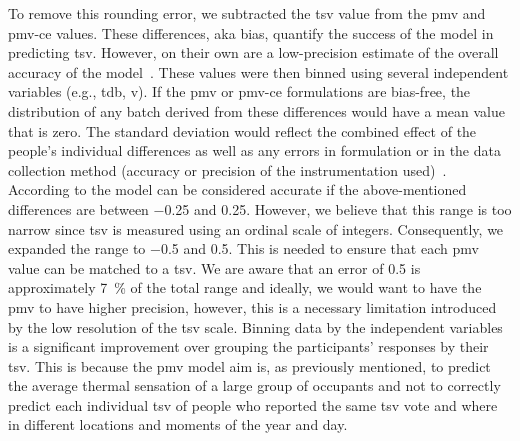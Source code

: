 To remove this rounding error, we subtracted the \ac{tsv} value from the \ac{pmv} and \ac{pmv-ce} values.
These differences, aka bias, quantify the success of the model in predicting \ac{tsv}.
However, on their own are a low-precision estimate of the overall accuracy of the model~\cite{Humphreys2002}.
These values were then binned using several independent variables (e.g., \ac{tdb}, \ac{v}).
If the \ac{pmv} or \ac{pmv-ce} formulations are bias-free, the distribution of any batch derived from these differences would have a mean value that is zero.
The standard deviation would reflect the combined effect of the people's individual differences as well as any errors in formulation or in the data collection method (accuracy or precision of the instrumentation used)~\cite{Humphreys2002}.
According to  the model can be considered accurate if the above-mentioned differences are between \num{-0.25} and \num{0.25}.
However, we believe that this range is too narrow since \ac{tsv} is measured using an ordinal scale of integers.
Consequently, we expanded the range to \num{-.5} and \num{0.5}.
This is needed to ensure that each \ac{pmv} value can be matched to a \ac{tsv}.
We are aware that an error of \num{.5} is approximately \qty{7}{\percent} of the total range and ideally, we would want to have the \ac{pmv} to have higher precision, however, this is a necessary limitation introduced by the low resolution of the \ac{tsv} scale.
Binning data by the independent variables is a significant improvement over grouping the participants' responses by their \ac{tsv}.
This is because the \ac{pmv} model aim is, as previously mentioned, to predict the average thermal sensation of a large group of occupants and not to correctly predict each individual \ac{tsv} of people who reported the same \ac{tsv} vote and where in different locations and moments of the year and day.

